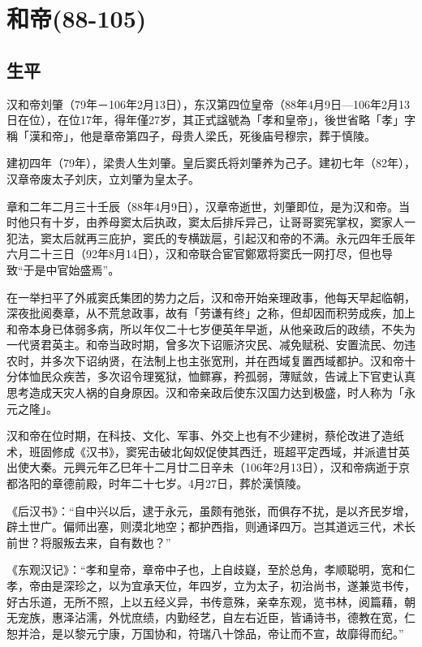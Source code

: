 
\section{和帝\tiny(88-105)}

\subsection{生平}

汉和帝刘肇（79年－106年2月13日），东汉第四位皇帝（88年4月9日—106年2月13日在位），在位17年，得年僅27岁，其正式諡號為「孝和皇帝」，後世省略「孝」字稱「漢和帝」，他是章帝第四子，母贵人梁氏，死後庙号穆宗，葬于慎陵。

建初四年（79年），梁贵人生刘肇。皇后窦氏将刘肇养为己子。建初七年（82年），汉章帝废太子刘庆，立刘肇为皇太子。

章和二年二月三十壬辰（88年4月9日），汉章帝逝世，刘肇即位，是为汉和帝。当时他只有十岁，由养母窦太后执政，窦太后排斥异己，让哥哥窦宪掌权，窦家人一犯法，窦太后就再三庇护，窦氏的专横跋扈，引起汉和帝的不满。永元四年壬辰年六月二十三日（92年8月14日），汉和帝联合宦官鄭眾将窦氏一网打尽，但也导致“于是中官始盛焉”。

在一举扫平了外戚窦氏集团的势力之后，汉和帝开始亲理政事，他每天早起临朝，深夜批阅奏章，从不荒怠政事，故有「劳谦有终」之称，但却因而积劳成疾，加上和帝本身已体弱多病，所以年仅二十七岁便英年早逝，从他亲政后的政绩，不失为一代贤君英主。和帝当政时期，曾多次下诏赈济灾民、减免赋税、安置流民、勿违农时，并多次下诏纳贤，在法制上也主张宽刑，并在西域复置西域都护。汉和帝十分体恤民众疾苦，多次诏令理冤狱，恤鳏寡，矜孤弱，薄赋敛，告诫上下官吏认真思考造成天灾人祸的自身原因。汉和帝亲政后使东汉国力达到极盛，时人称为「永元之隆」。

汉和帝在位时期，在科技、文化、军事、外交上也有不少建树，蔡伦改进了造纸术，班固修成《汉书》，窦宪击破北匈奴促使其西迁，班超平定西域，并派遣甘英出使大秦。元興元年乙巳年十二月廿二日辛未（106年2月13日），汉和帝病逝于京都洛阳的章德前殿，时年二十七岁。4月27日，葬於漢慎陵。

《后汉书》：“自中兴以后，逮于永元，虽颇有弛张，而俱存不扰，是以齐民岁增，辟土世广。偏师出塞，则漠北地空；都护西指，则通译四万。岂其道远三代，术长前世？将服叛去来，自有数也？”

《东观汉记》：“孝和皇帝，章帝中子也，上自歧嶷，至於总角，孝顺聪明，宽和仁孝，帝由是深珍之，以为宜承天位，年四岁，立为太子，初治尚书，遂兼览书传，好古乐道，无所不照，上以五经义异，书传意殊，亲幸东观，览书林，阅篇藉，朝无宠族，惠泽沾濡，外忧庶绩，内勤经艺，自左右近臣，皆诵诗书，德教在宽，仁恕并洽，是以黎元宁康，万国协和，符瑞八十馀品，帝让而不宣，故靡得而纪。”

